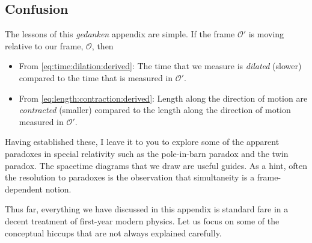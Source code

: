 \begin{subappendices}
\subsection{Confusion}

The lessons of this \emph{gedanken} appendix are simple. If the frame $\mathcal O'$ is moving relative to our frame, $\mathcal O$, then
\begin{itemize}
    \item From \eqref{eq:time:dilation:derived}: The time that we measure is \emph{dilated} (slower) compared to the time that is measured in $\mathcal O'$. 
    \item From \eqref{eq:length:contraction:derived}: Length along the direction of motion are \emph{contracted} (smaller) compared to the length along the direction of motion measured in $\mathcal O'$. 
\end{itemize}
Having established these, I leave it to you to explore some of the apparent paradoxes in special relativity such as the pole-in-barn paradox and the twin paradox. The spacetime diagrams that we draw are useful guides. As a hint, often the resolution to paradoxes is the observation that simultaneity is a frame-dependent notion.

Thus far, everything we have discussed in this appendix is standard fare in a decent treatment of first-year modern physics. Let us focus on some of the conceptual hiccups that are not always explained carefully.


\end{subappendices}
